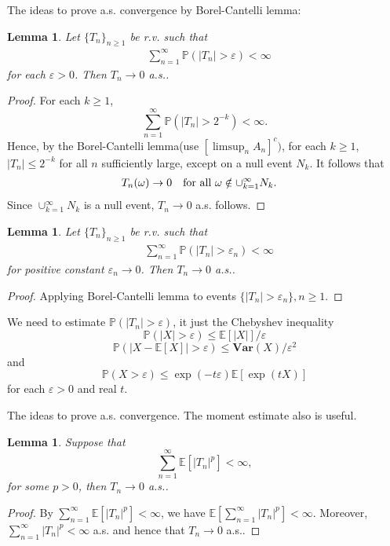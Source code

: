 \documentclass[11pt]{article}
\newtheorem{lemma}[theorem]{Lemma}
\theoremstyle{definition}
\newcommand{\abs}[1]{\left\vert#1\right\vert}
\begin{document}
{\color{blue}The ideas to prove a.s. convergence by Borel-Cantelli lemma: 
\begin{lemma}
  Let $\{T_n\}_{n\ge  1}$ be r.v. such that
\begin{equation*}
  \begin{aligned}
     & \sum^\infty_{n=1} \mathbb{P}(\abs{T_n}>\varepsilon)<\infty
  \end{aligned}
\end{equation*}
for each $\varepsilon>0$. Then $T_n\rightarrow 0$ a.s..
\end{lemma}
\begin{proof}
  For each $k\ge 1$, 
\[
\sum_{n=1}^\infty \mathbb{P}(\abs{T_n}>2^{-k})<\infty.
\]
Hence, by the Borel-Cantelli lemma(use $[\limsup_n A_n ]^c)$, for each $k\ge 1$, $\abs{T_n}\le 2^{-k}$ for all $n$ sufficiently large, except on a null event $N_k$. It follows that
\begin{equation*}
  \begin{aligned}
     & T_n(\omega)\rightarrow 0\text{\quad for all $\omega \notin \cup^\infty_{k=1}N_k$}.
  \end{aligned}
\end{equation*}
Since $\cup^\infty_{k=1}N_k$ is a null event, $T_n\rightarrow 0$ a.s. follows.
\end{proof}

\begin{lemma}
  Let $\{T_n\}_{n\ge  1}$ be r.v. such that
\begin{equation*}
  \begin{aligned}
     & \sum^\infty_{n=1} \mathbb{P}(\abs{T_n}>\varepsilon_n)<\infty
  \end{aligned}
\end{equation*}
for positive constant $\varepsilon_n\rightarrow 0$. Then $T_n\rightarrow 0$ a.s..
\end{lemma}
\begin{proof}
  Applying Borel-Cantelli lemma to events $\{ \abs{T_n}>\varepsilon_n \}, n\ge 1$.
\end{proof}

We need to estimate $\mathbb{P}(\abs{T_n}>\varepsilon)$, it just the Chebyshev inequality
\[
\mathbb{P}(\abs{X}>\varepsilon)\le \mathbb{E}[\abs{X}]/\varepsilon
\]
\[
\mathbb{P}(\abs{X-\mathbb{E}[X]}>\varepsilon)\le \mathbf{Var}(X)/\varepsilon^2
\]
and 
\[
\mathbb{P}(X>\varepsilon)\le \exp(-t\varepsilon)\mathbb{E}[\exp(tX)]
\]
for each $\varepsilon >0$ and real $t$. 



The ideas to prove a.s. convergence. The moment estimate also is useful. 
\begin{lemma}\label{1.8}
  Suppose that 
\[
\sum^\infty_{n=1}\mathbb{E}[\abs{T_n}^p]<\infty,
\]
for some $p>0$, then $T_n\rightarrow 0$ a.s..
\end{lemma}
\begin{proof}
  By $\sum^\infty_{n=1}\mathbb{E}[\abs{T_n}^p]<\infty$, we have $\mathbb{E}\left[ \sum^\infty_{n=1} \abs{T_n}^p\right]<\infty$.  Moreover, $\sum^\infty_{n=1}\abs{T_n}^p<\infty$ a.s. and hence that $T_n\rightarrow 0$ a.s..


\end{proof}}
\end{document}
